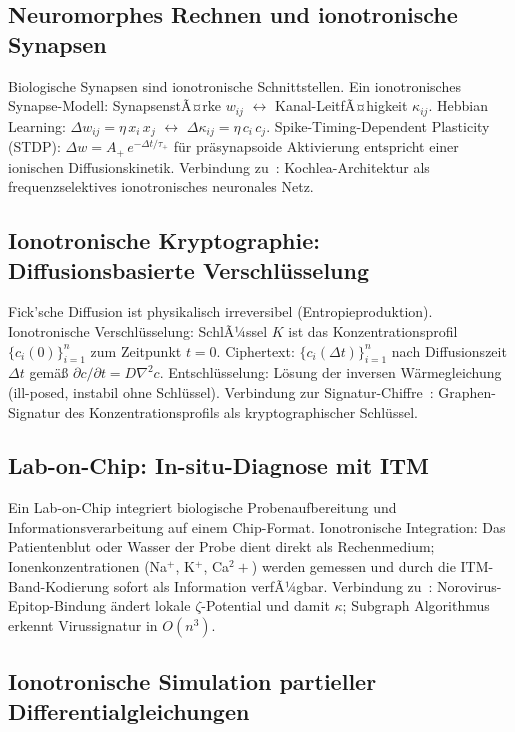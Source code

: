 ﻿\documentclass[a4paper,12pt]{article}
\theoremstyle{plain}
\theoremstyle{definition}
\theoremstyle{remark}
\begin{document}
\subsection{Neuromorphes Rechnen und ionotronische Synapsen}

Biologische Synapsen sind ionotronische Schnittstellen.
Ein ionotronisches Synapse-Modell:
SynapsenstÃ¤rke $w_{ij}$ $\leftrightarrow$ Kanal-LeitfÃ¤higkeit $\kappa_{ij}$.
Hebbian Learning: $\Delta w_{ij} = \eta\,x_i\,x_j$
$\leftrightarrow$ $\Delta\kappa_{ij} = \eta\,c_i\,c_j$.
Spike-Timing-Dependent Plasticity (STDP):
$\Delta w = A_+\,e^{-\Delta t/\tau_+}$ f\"ur pr\"asynapsoide Aktivierung
entspricht einer ionischen Diffusionskinetik.
Verbindung zu~\cite{epp2026nf6}: Kochlea-Architektur als frequenzselektives
ionotronisches neuronales Netz.

\subsection{Ionotronische Kryptographie: Diffusionsbasierte Verschl\"usselung}

Fick'sche Diffusion ist physikalisch irreversibel (Entropieproduktion).
Ionotronische Verschl\"usselung: SchlÃ¼ssel $K$ ist das Konzentrationsprofil
$\{c_i(0)\}_{i=1}^n$ zum Zeitpunkt $t=0$.
Ciphertext: $\{c_i(\Delta t)\}_{i=1}^n$ nach Diffusionszeit $\Delta t$
gem\"a{\ss} $\partial c/\partial t = D\nabla^2 c$.
Entschl\"usselung: L\"osung der inversen W\"armegleichung (ill-posed, instabil
ohne Schl\"ussel).
Verbindung zur Signatur-Chiffre~\cite{epp2026sigchiffre}:
Graphen-Signatur des Konzentrationsprofils als kryptographischer Schl\"ussel.

\subsection{Lab-on-Chip: In-situ-Diagnose mit ITM}

Ein Lab-on-Chip integriert biologische Probenaufbereitung und
Informationsverarbeitung auf einem Chip-Format.
Ionotronische Integration: Das Patientenblut oder Wasser der Probe
dient direkt als Rechenmedium; Ionenkonzentrationen (Na$^+$, K$^+$, Ca$^2+$)
werden gemessen und durch die ITM-Band-Kodierung sofort als Information
verfÃ¼gbar.
Verbindung zu~\cite{epp2026norovirus}: Norovirus-Epitop-Bindung \"andert
lokale $\zeta$-Potential und damit $\kappa$; Subgraph Algorithmus
erkennt Virussignatur in $O(n^3)$.

\subsection{Ionotronische Simulation partieller Differentialgleichungen}
\end{document}
